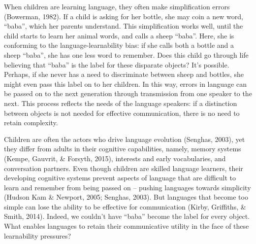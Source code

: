 \documentclass[10pt, letterpaper]{article}
\begin{document}
When children are learning language, they often make simplification
errors (Bowerman, 1982). If a child is asking for her bottle, she may
coin a new word, ``baba'', which her parents understand. This
simplification works well, until the child starts to learn her animal
words, and calls a sheep ``baba''. Here, she is conforming to the
language-learnability bias: if she calls both a bottle and a sheep
``baba'', she has one less word to remember. Does this child go through
life believing that ``baba'' is the label for these disparate objects?
It's possible. Perhaps, if she never has a need to discriminate between
sheep and bottles, she might even pass this label on to her children. In
this way, errors in language can be passed on to the next generation
through transmission from one speaker to the next. This process reflects
the needs of the language speakers: if a distinction between objects is
not needed for effective communication, there is no need to retain
complexity.

Children are often the actors who drive language evolution (Senghas,
2003), yet they differ from adults in their cognitive capabilities,
namely, memory systems (Kempe, Gauvrit, \& Forsyth, 2015), interests and
early vocabularies, and conversation partners. Even though children are
skilled language learners, their developing cognitive systems prevent
aspects of language that are difficult to learn and remember from being
passed on -- pushing languages towards simplicity (Hudson Kam \&
Newport, 2005; Senghas, 2003). But languages that become too simple can
lose the ability to be effective for communication (Kirby, Griffiths, \&
Smith, 2014). Indeed, we couldn't have ``baba'' become the label for
every object. What enables languages to retain their communicative
utility in the face of these learnability pressures?
\end{document}
